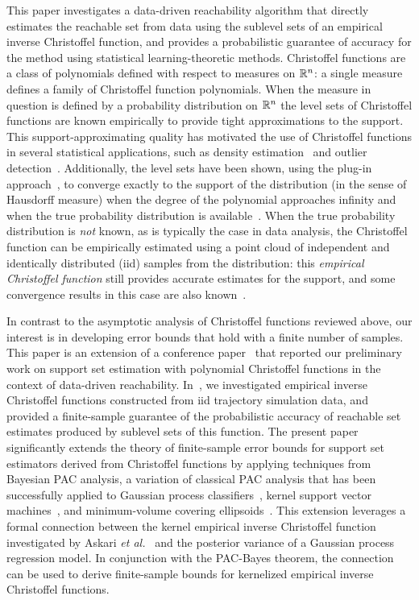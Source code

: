 \documentclass[onefignum,onetabnum]{siamart171218}
\begin{document}
This paper investigates a data-driven reachability algorithm that directly
estimates the reachable set from data using the sublevel sets of an empirical
inverse Christoffel function, and provides a probabilistic guarantee of accuracy
for the method using statistical learning-theoretic methods. Christoffel
functions are a class of polynomials defined with respect to measures on $\mathbb{R}^n$:
a single measure defines a family of Christoffel function polynomials.
When the measure in question is defined by a probability distribution on $\mathbb{R}^n$
the level sets of Christoffel functions are known empirically to
provide tight
approximations to the support.
This support-approximating quality has motivated the use of Christoffel
functions in several statistical applications, such as density
estimation~\cite{lasserre2017empirical, lasserre2019empirical} and outlier
detection~\cite{askari2018kernel}. Additionally, the level sets have been
shown, using the plug-in approach~\cite{cuevas1997plug}, to converge exactly to
the support of the distribution (in the sense of
Hausdorff measure) when the degree of the polynomial approaches infinity and
when the true probability distribution is available~\cite{lasserre2019empirical}.
When the true probability distribution is \emph{not} known, as is typically the case in
data analysis, the Christoffel function can be empirically estimated using a
point cloud of independent and identically distributed (iid) samples from the
distribution: this \emph{empirical Christoffel function} still provides accurate
estimates for the support, and some convergence results in this case are also known~\cite{pauwels2021data}. 

In contrast to the asymptotic analysis of Christoffel functions reviewed above,
our interest is in developing error bounds that hold with a finite number of samples.
This paper is an extension of a conference 
paper~\cite{devonport2021datadriven} 
that reported our preliminary
work on support set estimation with polynomial Christoffel functions in the context of
data-driven reachability. 
In~\cite{devonport2021datadriven}, 
we investigated empirical inverse Christoffel functions constructed from iid
trajectory simulation data, and
provided a finite-sample guarantee of the probabilistic accuracy of reachable
set estimates produced by sublevel sets of this function.
The present paper significantly extends the
theory of finite-sample error bounds for support set estimators derived from
Christoffel functions by applying techniques from Bayesian PAC analysis,
a variation of classical PAC analysis that has been successfully applied to
Gaussian process classifiers~\cite{seeger2002pac}, kernel support vector
machines~\cite{langford2003pac}, and minimum-volume covering
ellipsoids~\cite{dolia2006minimum}.
This extension leverages a formal connection between the kernel empirical
inverse Christoffel function investigated by Askari
\emph{et al.}~\cite{askari2018kernel} and the
posterior variance of a Gaussian process regression model. In
conjunction with the PAC-Bayes theorem, the connection can be used to derive finite-sample
bounds for kernelized empirical inverse Christoffel functions. 
\end{document}
